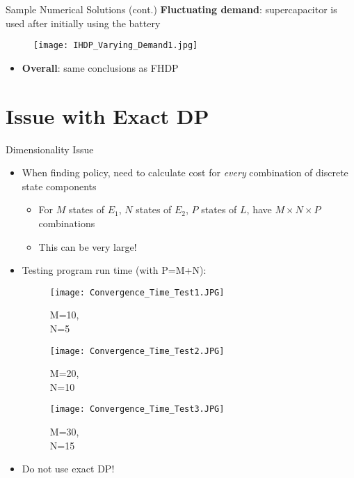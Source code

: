 \documentclass{beamer}
\begin{document}
\begin{frame}{Sample Numerical Solutions (cont.)}
\textbf{Fluctuating demand}: supercapacitor is used after initially using the battery
	\begin{figure}
		\texttt{[image: IHDP\_Varying\_Demand1.jpg]}
	\end{figure}
	
	\begin{itemize}
		\item \textbf{Overall}: same conclusions as FHDP
	\end{itemize}
\end{frame}

\section{Issue with Exact DP}
\begin{frame}{Dimensionality Issue}
\begin{itemize}
	\item When finding policy, need to calculate cost for \textit{every} combination of discrete state components
	\begin{itemize}
		\item For $M$ states of $E_{1}$, $N$ states of $E_{2}$, $P$ states of $L$, have $M \times N \times P$ combinations
		\item This can be very large!
	\end{itemize}
	\item Testing program run time (with P=M+N):

	\begin{minipage}{0.3\textwidth}
		\begin{figure}
			\texttt{[image: Convergence\_Time\_Test1.JPG]}
			\caption{M=10,\\N=5}
		\end{figure}
	\end{minipage}
	\begin{minipage}{0.3\textwidth}
		\begin{figure}
			\texttt{[image: Convergence\_Time\_Test2.JPG]}
			\caption{M=20,\\N=10}
		\end{figure}
	\end{minipage}
	\begin{minipage}{0.3\textwidth}
		\begin{figure}
			\texttt{[image: Convergence\_Time\_Test3.JPG]}
			\caption{M=30,\\N=15}
		\end{figure}
	\end{minipage}

	\item Do not use exact DP!
\end{itemize}
\end{frame}
\end{document}
